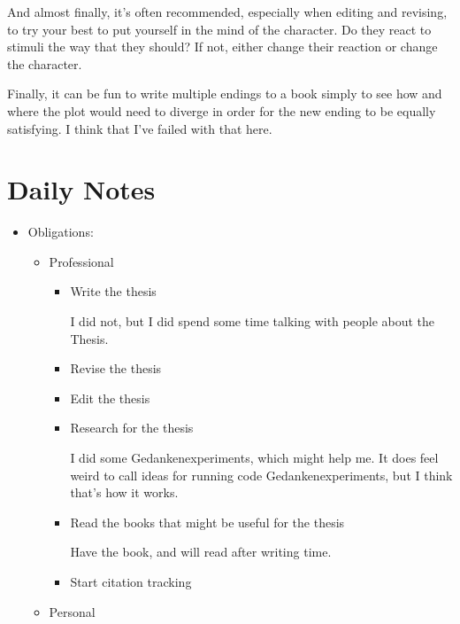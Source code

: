 \documentclass[12pt]{article}
\renewcommand{\,}{\textsuperscript{,}}
\begin{document}
And almost finally, it's often recommended, especially when editing and revising, to try your best to put yourself in the mind of the character.  
Do they react to stimuli the way that they should?  
If not, either change their reaction or change the character.

Finally, it can be fun to write multiple endings to a book simply to see how and where the plot would need to diverge in order for the new ending to be equally satisfying.  
I think that I've failed with that here.

\section{Daily Notes}

\begin{itemize}

\item Obligations:

\begin{itemize}

\item Professional

\begin{itemize}

\item Write the thesis

I did not, but I did spend some time talking with people about the Thesis.

\item Revise the thesis

\item Edit the thesis

\item Research for the thesis

I did some Gedankenexperiments, which might help me.  
It does feel weird to call ideas for running code Gedankenexperiments, but I think that's how it works.

\item Read the books that might be useful for the thesis

Have the book, and will read after writing time.

\item Start citation tracking

\end{itemize}

\item Personal

\begin{itemize}


\end{itemize}
\end{itemize}
\end{itemize}
\end{document}
